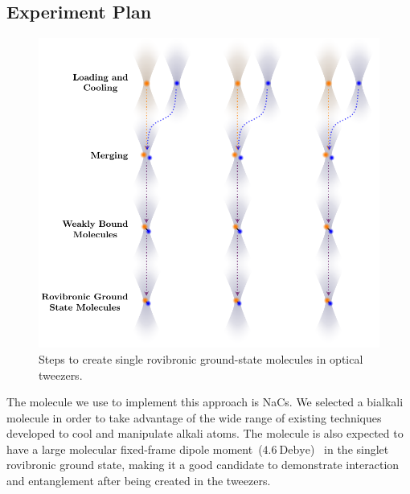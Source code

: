 \subsection{Experiment Plan}
\label{ch:introduction:tweezers:plan}

\begin{figure}
  \centering
  \includegraphics[width=\textwidth]{figures/introduction_steps.pdf}
  \caption[Molecule creation steps]{
    Steps to create single rovibronic ground-state molecules in optical tweezers.
    \label{fig:introduction:tweezers:plan:steps}}
\end{figure}

The molecule we use to implement this approach is NaCs.
We selected a bialkali molecule in order to take advantage of
the wide range of existing techniques developed to cool and manipulate alkali atoms.
The molecule is also expected to have a large
molecular fixed-frame dipole moment~($4.6~\mathrm{Debye}$)~\cite{
  dagdigian_molecular_1972,deiglmayr_calculations_2008}
in the singlet rovibronic ground state,
making it a good candidate to demonstrate interaction and entanglement
after being created in the tweezers.

